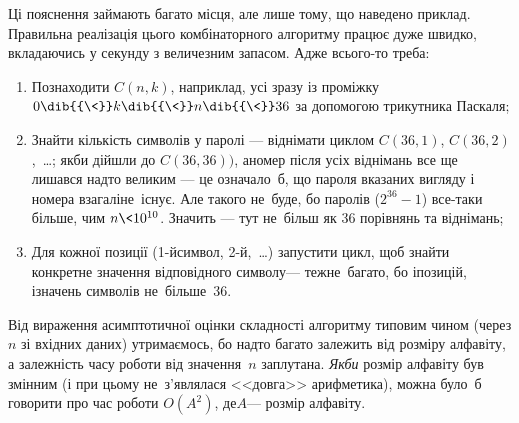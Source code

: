 Ці пояснення займають багато місця, але лише тому, що наведено приклад. Правильна реалізація цього комбінаторного алгоритму працює дуже швидко, вкладаючись у секунду з величезним запасом. Адже всього-то треба:

\begin{enumerate}

\item
Познаходити $C(n,k)$, наприклад, усі зразу із проміжку $0\dib{{\<}}k\dib{{\<}}n\dib{{\<}}36$ за допомогою трикутника Паскаля;

\item
Знайти кількість символів у паролі --- віднімати циклом $C(36,1)$, $C(36,2)$,~\dots; якби дійшли до $C(36,36))$, а\nolinebreak[3] номер після усіх віднімань все ще лишався надто великим --- це означало~б, що пароля вказаних вигляду і номера взагалі\nolinebreak[2] не~існує. Але такого не~буде, бо паролів ($2^{36}-1$) все-таки більше, чим $n{\<}10^{10}$. Значить --- тут %
не~більш як 36 порівнянь та віднімань;

\item
Для кожної позиції (1-й\nolinebreak[3] символ, 2-й,~\dots) запустити цикл, щоб знайти конкретне значення відповідного символу\nolinebreak[3] --- теж\nolinebreak[3] не~багато, бо і\nolinebreak[3] позицій, і\nolinebreak[3] значень символів не~більше~36.

\end{enumerate}

Від вираження асимптотичної оцінки складності алгоритму типовим чином (через $n$ зі вхідних даних) утримаємось, бо надто багато залежить від розміру алфавіту, а залежність часу роботи від значення~$n$ заплутана.
\emph{Якби} розмір алфавіту був змінним (і при цьому не~з'являлася <<довга>> арифметика), можна було~б говорити про час роботи $O(A^2)$, де\nolinebreak[3] $A$\nolinebreak[3] --- розмір алфавіту. 
\label{label:201415-3-C-finish}


